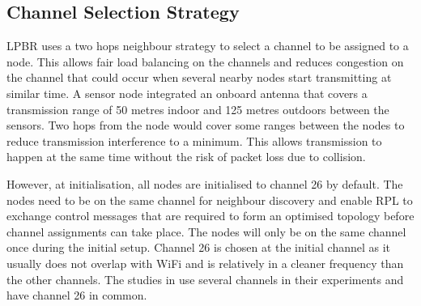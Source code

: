 

\subsection{Channel Selection Strategy}

LPBR uses a two hops neighbour strategy to select a channel to be assigned to a node. This allows fair load balancing on the channels and reduces congestion on the channel that could occur when several nearby nodes start transmitting at similar time. A sensor node integrated an onboard antenna that covers a transmission range of 50 metres indoor and 125 metres outdoors between the sensors. Two hops from the node would cover some ranges between the nodes to reduce transmission interference to a minimum. This allows transmission to happen at the same time without the risk of packet loss due to collision. 

However, at initialisation, all nodes are initialised to channel 26 by default. The nodes need to be on the same channel for neighbour discovery and enable RPL to exchange control messages that are required to form an optimised topology before channel assignments can take place. The nodes will only be on the same channel once during the initial setup. Channel 26 is chosen at the initial channel as it usually does not overlap with WiFi and is relatively in a cleaner frequency than the other channels. The studies in \cite{chrysso}\cite{micmac}\cite{watteyne} use several channels in their experiments and have channel 26 in common.



